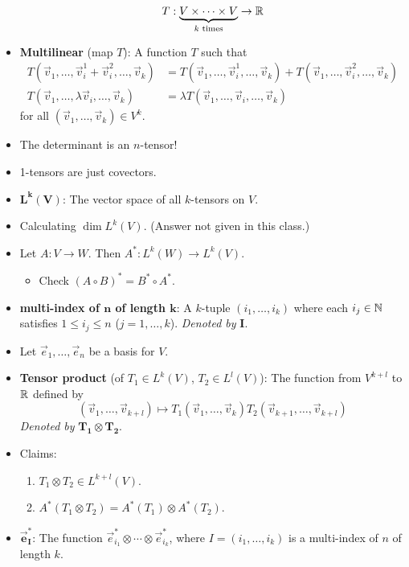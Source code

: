 \documentclass[../notes.tex]{subfiles}
\begin{document}
\begin{itemize}
\begin{equation*}
        T:\underbrace{V\times\cdots\times V}_{k\text{ times}}\to\mathbb{R}
    \end{equation*}
    \item \textbf{Multilinear} (map $T$): A function $T$ such that
    \begin{align*}
        T(\vec{v}_1,\dots,\vec{v}_i^1+\vec{v}_i^2,\dots,\vec{v}_k) &= T(\vec{v}_1,\dots,\vec{v}_i^1,\dots,\vec{v}_k)+T(\vec{v}_1,\dots,\vec{v}_i^2,\dots,\vec{v}_k)\\
        T(\vec{v}_1,\dots,\lambda \vec{v}_i,\dots,\vec{v}_k) &= \lambda T(\vec{v}_1,\dots,\vec{v}_i,\dots,\vec{v}_k)
    \end{align*}
    for all $(\vec{v}_1,\dots,\vec{v}_k)\in V^k$.
    \item The determinant is an $n$-tensor!
    \item 1-tensors are just covectors.
    \item $\bm{L^k(V)}$: The vector space of all $k$-tensors on $V$.
    \item Calculating $\dim L^k(V)$. (Answer not given in this class.)
    \item Let $A:V\to W$. Then $A^*:L^k(W)\to L^k(V)$.
    \begin{itemize}
        \item Check $(A\circ B)^*=B^*\circ A^*$.
    \end{itemize}
    \item \textbf{multi-index of $\bm{n}$ of length $\bm{k}$}: A $k$-tuple $(i_1,\dots,i_k)$ where each $i_j\in\mathbb{N}$ satisfies $1\leq i_j\leq n$ ($j=1,\dots,k$). \emph{Denoted by} $\bm{I}$.
    \item Let $\vec{e}_1,\dots,\vec{e}_n$ be a basis for $V$.
    \item \textbf{Tensor product} (of $T_1\in L^k(V)$, $T_2\in L^l(V)$): The function from $V^{k+l}$ to $\mathbb{R}$ defined by
    \begin{equation*}
        (\vec{v}_1,\dots,\vec{v}_{k+l}) \mapsto T_1(\vec{v}_1,\dots,\vec{v}_k)T_2(\vec{v}_{k+1},\dots,\vec{v}_{k+l})
    \end{equation*}
    \emph{Denoted by} $\bm{T_1\otimes T_2}$.
    \item Claims:
    \begin{enumerate}
        \item $T_1\otimes T_2\in L^{k+l}(V)$.
        \item $A^*(T_1\otimes T_2)=A^*(T_1)\otimes A^*(T_2)$.
    \end{enumerate}
    \item $\bm{\vec{e}_I^*}$: The function $\vec{e}_{i_1}^*\otimes\cdots\otimes\vec{e}_{i_k}^*$, where $I=(i_1,\dots,i_k)$ is a multi-index of $n$ of length $k$.

\end{itemize}
\end{document}
